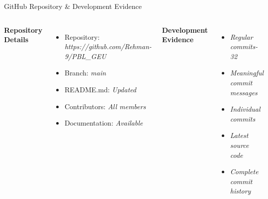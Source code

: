 \documentclass[aspectratio=169,11pt]{beamer}
\newcommand{\placeholder}[1]{%
\textit{\color{GEUGrey}#1}
}
\begin{document}
\begin{frame}{GitHub Repository \& Development Evidence}

\begin{columns}[T,totalwidth=\textwidth]


\textbf{\color{GEUBlue}Repository Details}

\begin{itemize}\itemsep3pt
    \item Repository: \placeholder{https://github.com/Rehman-9/PBL\_GEU}
    \item Branch: \placeholder{main}
    \item README.md: \placeholder{Updated}
    \item Contributors: \placeholder{All members}
    \item Documentation: \placeholder{Available}
\end{itemize}


\textbf{\color{GEUBlue}Development Evidence}

\begin{itemize}\itemsep3pt
    \item \placeholder{Regular commits-32}
    \item \placeholder{Meaningful commit messages}
    \item \placeholder{Individual commits}
    \item \placeholder{Latest source code}
    \item \placeholder{Complete commit history}
\end{itemize}

\end{columns}

\vfill


\end{frame}
\end{document}
